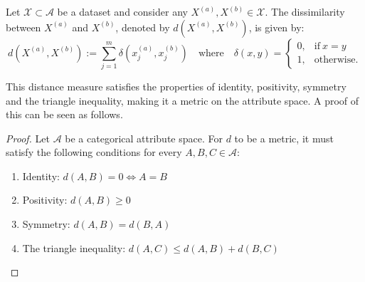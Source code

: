 \begin{definition}\label{def:dissim}
    Let \(\mathcal{X} \subset \mathcal A\) be a dataset and consider any
    \(X^{(a)}, X^{(b)} \in \mathcal{X}\). The dissimilarity between \(X^{(a)}\)
    and \(X^{(b)}\), denoted by \(d\left(X^{(a)}, X^{(b)}\right)\), is given by:
    \begin{equation}\label{eq:dissim}
        d\left(X^{(a)}, X^{(b)}\right) := \sum_{j=1}^{m} \delta\left(x_j^{(a)},
        x_j^{(b)}\right) \quad \text{where} \quad \delta\left(x, y\right) =
        \begin{cases}
            0, & \text{if} \ x = y \\
            1, & \text{otherwise.}
        \end{cases}
    \end{equation}

    This distance measure satisfies the properties of identity, positivity,
    symmetry and the triangle inequality, making it a metric on the attribute
    space. A proof of this can be seen as follows.

    \begin{proof}
        Let \(\mathcal A\) be a categorical attribute space. For \(d\) to be a
        metric, it must satisfy the following conditions for every \(A, B, C \in
        \mathcal A\):
        \begin{enumerate}
            \item Identity: \(d(A, B) = 0 \iff A = B\)
            \item Positivity: \(d(A, B) \geq 0\)
            \item Symmetry: \(d(A, B) = d(B, A)\)
            \item The triangle inequality: \(d(A, C) \leq d(A, B) + d(B, C)\)
        \end{enumerate}


\end{proof}
\end{definition}
